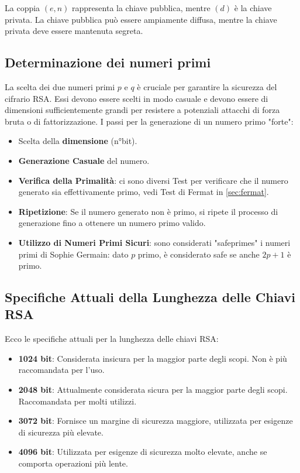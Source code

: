 \documentclass[a4paper,12pt]{report}
\begin{document}
La coppia $(e, n)$ rappresenta la chiave pubblica, mentre $(d)$ è la chiave privata. La chiave pubblica può essere ampiamente diffusa, mentre la chiave privata deve essere mantenuta segreta.

\subsection*{Determinazione dei numeri primi}
La scelta dei due numeri primi $p$ e $q$ è cruciale per garantire la sicurezza del cifrario RSA. 
Essi devono essere scelti in modo casuale e devono essere di dimensioni sufficientemente grandi per resistere a potenziali attacchi di forza bruta o di fattorizzazione.
I passi per la generazione di un numero primo "forte":

\begin{itemize}
    \item{Scelta della \textbf{dimensione} (n°bit).}
    \item{\textbf{Generazione Casuale} del numero.} 
    \item{\textbf{Verifica della Primalità}: ci sono diversi Test per verificare che il numero generato sia effettivamente primo, vedi Test di Fermat in \ref{sec:fermat}.}
    \item{\textbf{Ripetizione}: Se il numero generato non è primo, si ripete il processo di generazione fino a ottenere un numero primo valido.}
    \item{\textbf{Utilizzo di Numeri Primi Sicuri}: sono considerati "safeprimes" i numeri primi di Sophie Germain: dato $p$ primo, è considerato safe se anche \(2p+1\) è primo. \cite{boneh2005}}
\end{itemize}

\subsection*{Specifiche Attuali della Lunghezza delle Chiavi RSA}

Ecco le specifiche attuali per la lunghezza delle chiavi RSA:

\begin{itemize}
    \item \textbf{1024 bit}: Considerata insicura per la maggior parte degli scopi. Non è più raccomandata per l'uso.
    \item \textbf{2048 bit}: Attualmente considerata sicura per la maggior parte degli scopi. Raccomandata per molti utilizzi.
    \item \textbf{3072 bit}: Fornisce un margine di sicurezza maggiore, utilizzata per esigenze di sicurezza più elevate.
    \item \textbf{4096 bit}: Utilizzata per esigenze di sicurezza molto elevate, anche se comporta operazioni più lente.
\end{itemize}
\end{document}
